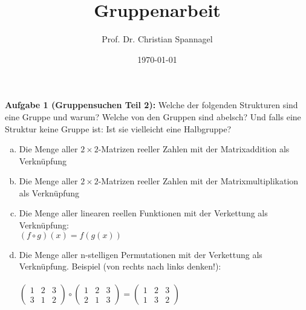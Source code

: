 \documentclass{../cssheet}
\title{Gruppenarbeit}
\author{Prof. Dr. Christian Spannagel}
\date{\today}
\begin{document}
\printtitle


\textbf{Aufgabe 1 (Gruppensuchen Teil 2):} Welche der folgenden Strukturen sind eine Gruppe und warum? Welche von den Gruppen sind abelsch? Und falls eine Struktur keine Gruppe ist: Ist sie vielleicht eine Halbgruppe?

\begin{enumerate}[a)]
\item Die Menge aller $2\times 2$-Matrizen reeller Zahlen mit der Matrixaddition als Verknüpfung
\item Die Menge aller $2\times 2$-Matrizen reeller Zahlen mit der Matrixmultiplikation als Verknüpfung
\item Die Menge aller linearen reellen Funktionen mit der Verkettung als Verknüpfung:\\ $(f\circ g) (x) = f ( g (x))$
\item Die Menge aller n-stelligen Permutationen mit der Verkettung als Verknüpfung. Beispiel (von rechts nach links denken!):\\
\\ 
\begin{math}\begin{pmatrix} 1 & 2 & 3 \\ 3 & 1 & 2 \end{pmatrix} \circ \begin{pmatrix} 1 & 2 & 3 \\ 2 & 1 & 3 \end{pmatrix} = \begin{pmatrix} 1 & 2 & 3 \\ 1 & 3 & 2 \end{pmatrix}\end{math}
\end{enumerate}


\vspace*{2cm}
\printlicense

\printsocials
\end{document}
